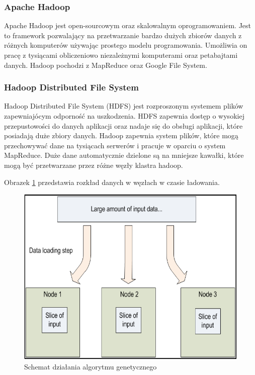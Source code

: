 \subsubsection{Apache Hadoop}
\label{ssub:apache_hadoop}
Apache Hadoop jest open-sourcowym oraz skalowalnym oprogramowaniem. Jest to framework pozwalający na przetwarzanie bardzo dużych zbiorów danych z różnych komputerów używając prostego modelu programowania. Umożliwia on pracę z tysiącami obliczeniowo niezależnymi komputerami oraz petabajtami danych. Hadoop pochodzi z MapReduce oraz Google File System.

\subsubsection{Hadoop Distributed File System}
\label{ssub:hdfs}
Hadoop Distributed File System (HDFS) jest rozproszonym systemem plików zapewniajócym odporność na uszkodzenia. HDFS zapewnia dostęp o wysokiej przepustowości do danych aplikacji oraz nadaje się do obsługi aplikacji, które posiadają duże zbiory danych. Hadoop zapewnia system plików, które mogą przechowywać dane na tysiącach serwerów i pracuje w oparciu o system MapReduce. Duże dane automatycznie dzielone są na mniejsze kawałki, które mogą być przetwarzane przez różne węzły klastra hadoop.

Obrazek \ref{fig:rozklad_danych} przedstawia rozkład danych w węzłach w czasie ładowania.

\begin{figure}[h]
    \centerline{\includegraphics[scale=0.5]{obrazki/rozklad_danych.png}}
    \caption{Schemat działania algorytmu genetycznego}
    \label{fig:rozklad_danych}
\end{figure}

